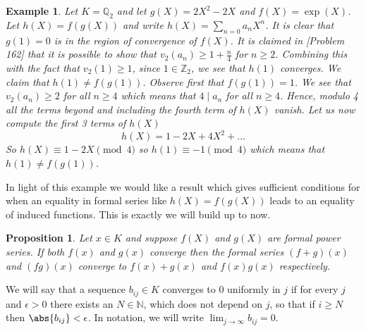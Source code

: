 \documentclass{article}
\newtheorem{proposition}{Proposition}[section]
\newtheorem{example}{Example}[section]
\newcommand{\mbb}[1]{\mathbb{#1}}
\numberwithin{equation}{section}
\begin{document}
\begin{example}\label{ex: h(X) != f(g(X))}
    Let $K = \mbb Q_2$ and let $g(X) = 2X^2 - 2X$ and $f(X) = \exp(X)$. Let $h(X) = f(g(X))$ and write $h(X) = \sum_{n = 0}a_n X^n$. It is clear that $g(1) = 0$ is in the region of convergence of $f(X)$. It is claimed in \citep{gouvea}[Problem 162] that it is possible to show that $v_2(a_n) \geq 1 + \frac{n}{4}$ for $n \geq 2$. Combining this with the fact that $v_2(1) \geq 1$, since $1 \in \mbb Z_2$, we see that $h(1)$ converges. We claim that $h(1) \neq f(g(1))$. Observe first that $f(g(1))= 1$. We see that $v_2(a_n) \geq 2$ for all $n \geq 4$ which means that $4 \mid a_n$ for all $n \geq 4$. Hence, modulo 4 all the terms beyond and including the fourth term of $h(X)$ vanish. Let us now compute the first 3 terms of $h(X)$ 
    $$h(X) = 1 - 2X + 4X^2 + \ldots$$
    So $h(X) \equiv 1 - 2X \pmod {4}$ so $h(1) \equiv -1 \pmod {4}$ which means that $h(1) \neq f(g(1))$.
\end{example}
In light of this example we would like a result which gives sufficient conditions for when an equality in formal series like $h(X) = f(g(X))$ leads to an equality of induced functions. This is exactly we will build up to now. 

\begin{proposition}\label{prop: Convergence of sum and product of power series}
    Let $x \in K$ and suppose $f(X)$ and $g(X)$ are formal power series. If both $f(x)$ and $g(x)$ converge then the formal series $(f+g)(x)$ and $(fg)(x)$ converge to $f(x) + g(x)$ and $f(x)g(x)$ respectively.
\end{proposition}
    




We will say that a sequence $b_{ij} \in K$ converges to 0 uniformly in $j$ if for every $j$ and $\epsilon > 0$ there exists an $N \in \mbb N$, which does not depend on $j$, so that if $i \geq N$ then $\abs{b_{ij}} < \epsilon$. In notation, we will write $\lim_{j \to \infty}b_{ij} = 0$.
\end{document}
